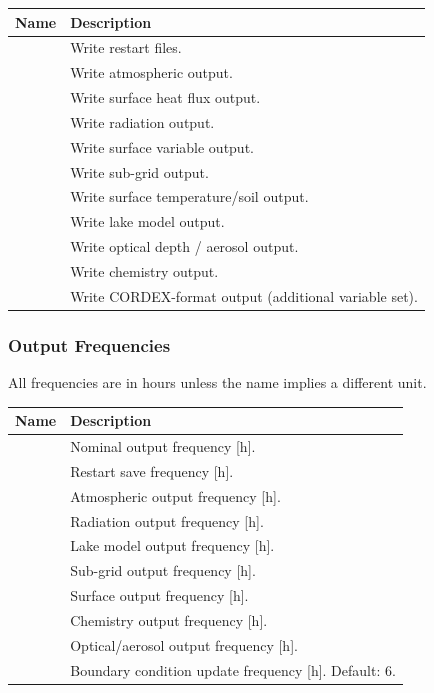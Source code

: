 \begin{longtable}{L{3cm} L{9cm}}
  \toprule
  \textbf{Name} & \textbf{Description} \\
  \midrule
  \endhead
  \bottomrule
  \endfoot
     & Write restart files. \\
      & Write atmospheric output. \\
      & Write surface heat flux output. \\
      & Write radiation output. \\
      & Write surface variable output. \\
      & Write sub-grid output. \\
      & Write surface temperature/soil output. \\
      & Write lake model output. \\
      & Write optical depth / aerosol output. \\
     & Write chemistry output. \\
   & Write CORDEX-format output (additional variable set). \\
\end{longtable}

\subsubsection{Output Frequencies}

All frequencies are in hours unless the name implies a different unit.

\begin{longtable}{L{3.5cm} L{9cm}}
  \toprule
  \textbf{Name} & \textbf{Description} \\
  \midrule
  \endhead
  \bottomrule
  \endfoot
    & Nominal output frequency [h]. \\
    & Restart save frequency [h]. \\
    & Atmospheric output frequency [h]. \\
    & Radiation output frequency [h]. \\
    & Lake model output frequency [h]. \\
    & Sub-grid output frequency [h]. \\
    & Surface output frequency [h]. \\
   & Chemistry output frequency [h]. \\
    & Optical/aerosol output frequency [h]. \\
   & Boundary condition update frequency [h]. Default: 6. \\
\end{longtable}

